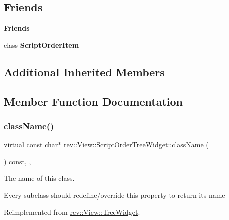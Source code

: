 \subsection*{Friends}
\begin{Indent}\textbf{ Friends}\par
\begin{DoxyCompactItemize}
\item 
\mbox{\label{classrev_1_1_view_1_1_script_order_tree_widget_a3f8bbb1c693a394110a70bbd30faa7ca}} 
class {\bfseries Script\+Order\+Item}
\end{DoxyCompactItemize}
\end{Indent}
\subsection*{Additional Inherited Members}


\subsection{Member Function Documentation}
\mbox{\label{classrev_1_1_view_1_1_script_order_tree_widget_ac1972eb933746c0f38059c8a78f4a36d}} 
\subsubsection{\texorpdfstring{className()}{className()}}
{\footnotesize\ttfamily virtual const char$\ast$ rev\+::\+View\+::\+Script\+Order\+Tree\+Widget\+::class\+Name (\begin{DoxyParamCaption}{ }\end{DoxyParamCaption}) const\hspace{0.3cm}{\ttfamily [inline]}, {\ttfamily [override]}, {\ttfamily [virtual]}}



The name of this class. 

Every subclass should redefine/override this property to return its name 

Reimplemented from \mbox{\hyperlink{classrev_1_1_view_1_1_tree_widget_aedde04f44badced7c60f0e1570e3d0b2}{rev\+::\+View\+::\+Tree\+Widget}}.

